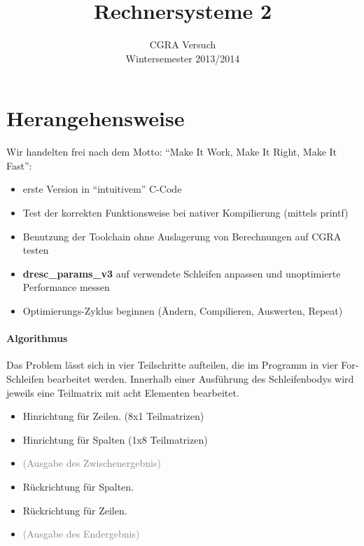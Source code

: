 \documentclass[oneside,11pt,accentcolor=tud2b, nochapname]{tudexercise}
\title{Rechnersysteme 2}
\subtitle{CGRA Versuch\\
Wintersemester 2013/2014}
\begin{document}
\maketitle

\section*{Herangehensweise}
Wir handelten frei nach dem Motto: "`Make It Work, Make It Right, Make It Fast"':

\begin{itemize}
	\item erste Version in "`intuitivem"' C-Code
	\item Test der korrekten Funktionsweise bei nativer Kompilierung (mittels printf)
	\item Benutzung der Toolchain ohne Auslagerung von Berechnungen auf CGRA testen
	\item \textbf{dresc\_params\_v3} auf verwendete Schleifen anpassen und unoptimierte Performance messen
	\item Optimierungs-Zyklus beginnen (Ändern, Compilieren, Auswerten, Repeat)
\end{itemize}

\paragraph{Algorithmus}
Das Problem lässt sich in vier Teilschritte aufteilen, die im Programm in vier For-Schleifen bearbeitet werden.
Innerhalb einer Ausführung des Schleifenbodys wird jeweils eine Teilmatrix mit acht Elementen bearbeitet.
\begin{itemize}
	\item Hinrichtung für Zeilen. (8x1 Teilmatrizen)
	\item Hinrichtung für Spalten (1x8 Teilmatrizen)
	\item \textcolor{gray}{(Ausgabe des Zwischenergebnis)}
	\item Rückrichtung für Spalten.
	\item Rückrichtung für Zeilen.
	\item \textcolor{gray}{(Ausgabe des Endergebnis)}
\end{itemize}
\end{document}
